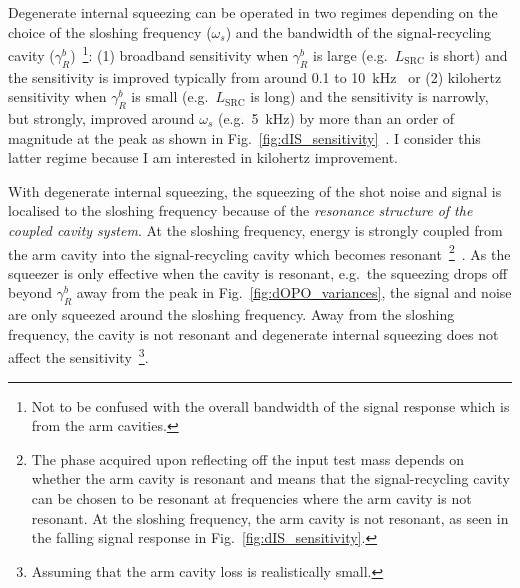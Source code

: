 Degenerate internal squeezing can be operated in two regimes depending on the choice of the sloshing frequency ($\omega_s$) and the bandwidth of the signal-recycling cavity ($\gamma^b_R$)~\footnote{Not to be confused with the overall bandwidth of the signal response which is from the arm cavities.}: (1) broadband sensitivity when $\gamma^b_R$ is large (e.g.\ $L_\text{SRC}$ is short) and the sensitivity is improved typically from around 0.1 to 10~kHz~\cite{korobkoQuantumExpanderGravitationalwave2019} or (2) kilohertz sensitivity when $\gamma^b_R$ is small (e.g.\ $L_\text{SRC}$ is long) and the sensitivity is narrowly, but strongly, improved around $\omega_s$ (e.g.\ 5~kHz) by more than an order of magnitude at the peak as shown in Fig.~\ref{fig:dIS_sensitivity}~\cite{adyaQuantumEnhancedKHz2020}. I consider this latter regime because I am interested in kilohertz improvement.

With degenerate internal squeezing, the squeezing of the shot noise and signal is localised to the sloshing frequency because of the \emph{resonance structure of the coupled cavity system}. At the sloshing frequency, energy is strongly coupled from the arm cavity into the signal-recycling cavity which becomes resonant~\footnote{The phase acquired upon reflecting off the input test mass depends on whether the arm cavity is resonant and means that the signal-recycling cavity can be chosen to be resonant at frequencies where the arm cavity is not resonant. At the sloshing frequency, the arm cavity is not resonant, as seen in the falling signal response in Fig.~\ref{fig:dIS_sensitivity}.}~\cite{korobkoTamingQuantumNoiseHow2020}. As the squeezer is only effective when the cavity is resonant, e.g.\ the squeezing drops off beyond $\gamma^b_R$ away from the peak in Fig.~\ref{fig:dOPO_variances}, the signal and noise are only squeezed around the sloshing frequency. Away from the sloshing frequency, the cavity is not resonant and degenerate internal squeezing does not affect the sensitivity~\footnote{Assuming that the arm cavity loss is realistically small.}.

